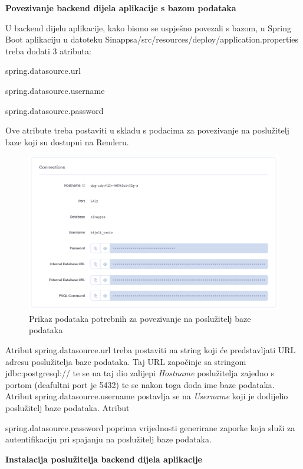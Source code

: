 			\noindent \textbf{Povezivanje backend dijela aplikacije s bazom podataka}
			
			U backend dijelu aplikacije, kako bismo se uspješno povezali s bazom, u Spring Boot aplikaciju u datoteku Sinappsa/src/resources/deploy/application.properties treba dodati 3 atributa:
			\begin{packed_item}
				\item spring.datasource.url 
				\item spring.datasource.username 
				\item spring.datasource.password
			\end{packed_item}
			Ove atribute treba postaviti u skladu s podacima za povezivanje na poslužitelj baze koji su dostupni na Renderu.
			\begin{figure}[H]
				\includegraphics[scale=0.5]{slike/slika3.png}
				\centering
				\caption{Prikaz podataka potrebnih za povezivanje na poslužitelj baze podataka}
				\label{fig:povez baz pod}
			\end{figure}
			
			Atribut spring.datasource.url treba postaviti na string koji će predstavljati URL adresu poslužitelja baze podataka. Taj URL započinje sa stringom jdbc:postgresql:// te se na taj dio zalijepi \textit{Hostname} poslužitelja zajedno s portom (deafultni port je 5432) te se nakon toga doda ime baze podataka. Atribut spring.datasource.username postavlja se na \textit{Username} koji je dodijelio poslužitelj baze podataka. Atribut 
			
			\noindent spring.datasource.password poprima vrijednosti generirane zaporke koja služi za autentifikaciju pri spajanju na poslužitelj baze podataka.
			
			
			\noindent \textbf{Instalacija poslužitelja backend dijela aplikacije}
			
